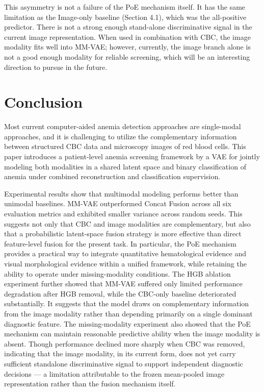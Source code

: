\documentclass[conference]{IEEEtran}
\begin{document}
This asymmetry is not a failure of the PoE mechanism itself. It has the same limitation as the Image-only baseline (Section 4.1), which was the all-positive predictor. There is not a strong enough stand-alone discriminative signal in the current image representation. When used in combination with CBC, the image modality fits well into MM-VAE; however, currently, the image branch alone is not a good enough modality for reliable screening, which will be an interesting direction to pursue in the future.

\FloatBarrier

\section{Conclusion}

Most current computer-aided anemia detection approaches are single-modal approaches, and it is challenging to utilize the complementary information between structured CBC data and microscopy images of red blood cells. This paper introduces a patient-level anemia screening framework by a VAE for jointly modeling both modalities in a shared latent space and binary classification of anemia under combined reconstruction and classification supervision.

Experimental results show that multimodal modeling performs better than unimodal baselines. MM-VAE outperformed Concat Fusion across all six evaluation metrics and exhibited smaller variance across random seeds. This suggests not only that CBC and image modalities are complementary, but also that a probabilistic latent-space fusion strategy is more effective than direct feature-level fusion for the present task. In particular, the PoE mechanism provides a practical way to integrate quantitative hematological evidence and visual morphological evidence within a unified framework, while retaining the ability to operate under missing-modality conditions. The HGB ablation experiment further showed that MM-VAE suffered only limited performance degradation after HGB removal, while the CBC-only baseline deteriorated substantially. It suggests that the model draws on complementary information from the image modality rather than depending primarily on a single dominant diagnostic feature. The missing-modality experiment also showed that the PoE mechanism can maintain reasonable predictive ability when the image modality is absent. Though performance declined more sharply when CBC was removed, indicating that the image modality, in its current form, does not yet carry sufficient standalone discriminative signal to support independent diagnostic decisions --- a limitation attributable to the frozen mean-pooled image representation rather than the fusion mechanism itself.
\end{document}

